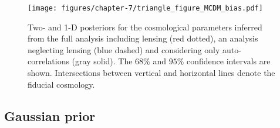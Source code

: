 \begin{figure}[bthp]
\centering
\texttt{[image: figures/chapter-7/triangle\_figure\_MCDM\_bias.pdf]} 
\caption{Two- and 1-D posteriors for the cosmological parameters inferred from the full analysis including lensing (red dotted), an analysis neglecting lensing (blue dashed) and considering only auto-correlations (gray solid).
{The $68\%$ and $95\%$ confidence intervals are shown.}
Intersections between vertical and horizontal lines denote the fiducial cosmology.
}
\label{Fig:mcmc-flat-prior}
\end{figure}


\subsection{Gaussian prior}


